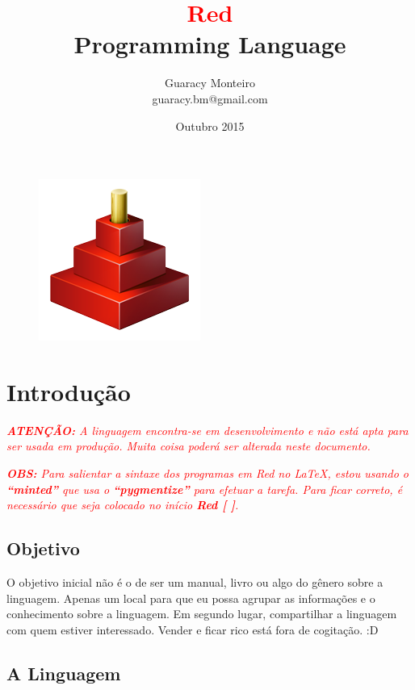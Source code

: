 \documentclass[12pt]{article}
\title{\huge \textbf{\textcolor{red}{Red}} \\Programming Language}
\author{Guaracy Monteiro \\ guaracy.bm@gmail.com} %
\date{Outubro 2015}
\begin{document}
\begin{titlepage}
\begin{figure}  %
\centering
\includegraphics[scale=1]{Red_Language_Tower_Logo.png}
\end{figure}
\maketitle
\end{titlepage}

\tableofcontents
\pagebreak
\renewcommand\listingscaption{Listagem}
\renewcommand\listoflistingscaption{Listagens}
\listoflistings
\pagebreak


\section{Introdução}

\textit{\textcolor{red}{\textbf{ATENÇÃO:} A linguagem encontra-se em desenvolvimento e não está apta para ser
usada em produção. Muita coisa poderá ser alterada neste documento.}}

\textit{\textcolor{red}{\textbf{OBS:} Para salientar a sintaxe dos programas em Red no \LaTeX, estou usando o
\textbf{``minted''} que usa o \textbf{``pygmentize''} para efetuar a tarefa.
Para ficar correto, é necessário que seja colocado no início \textbf{Red [ ]}.}}

\subsection{Objetivo}

O objetivo inicial não é o de ser um manual, livro ou algo do gênero sobre a
linguagem. Apenas um local para que eu possa agrupar as informações e o
conhecimento sobre a linguagem. Em segundo lugar, compartilhar a linguagem com
quem estiver interessado. Vender e ficar rico está fora de cogitação. :D

\subsection{A Linguagem}
\end{document}
